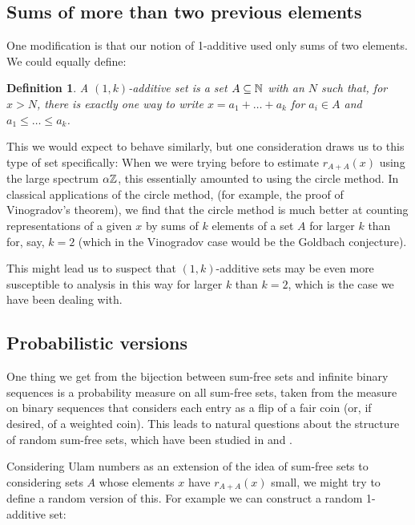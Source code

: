 \documentclass{report}
\newtheorem{definition}[theorem]{Definition}
\theoremstyle{remark}
\numberwithin{equation}{section}
\begin{document}
\subsection{Sums of more than two previous elements}

One modification is that our notion of 1-additive used only sums of
two elements.  We could equally define: 

\begin{definition}\label{def:1k_additive}
A $(1,k)$-additive set is a set $A \subseteq \mathbb{N}$ with an $N$ such
that, for $x > N$, there is exactly one way to write $x = a_1 + \ldots
+ a_k$ for $a_i \in A$ and $a_1 \leq \ldots \leq a_k$.  
\end{definition}

This we would expect to behave similarly, but one consideration draws
us to this type of set specifically: When we were trying before to
estimate $r_{A+A}(x)$ using the large spectrum $\alpha\mathbb{Z}$, this
essentially amounted to using the circle method.  In classical
applications of the circle method, (for example, the proof of
Vinogradov's theorem), we find that the circle method is much better
at counting representations of a given $x$ by sums of $k$ elements of
a set $A$ for larger $k$ than for, say, $k = 2$ (which in the
Vinogradov case would be the Goldbach conjecture).

This might lead us to suspect that $(1,k)$-additive sets may be even
more susceptible to analysis in this way for larger $k$ than $k = 2$,
which is the case we have been dealing with.

\subsection{Probabilistic versions}

One thing we get from the bijection between sum-free sets and infinite
binary sequences is a probability measure on all sum-free sets, taken
from the measure on binary sequences that considers each entry as a
flip of a fair coin (or, if desired, of a weighted coin).  This leads
to natural questions about the structure of random sum-free sets,
which have been studied in \cite{cameron:ptrf1987} and
\cite{calkin:dm1998}.

Considering Ulam numbers as an extension of the idea of sum-free sets
to considering sets $A$ whose elements $x$ have $r_{A+A}(x)$ small, we
might try to define a random version of this.  For example we can
construct a random 1-additive set: 
\end{document}

